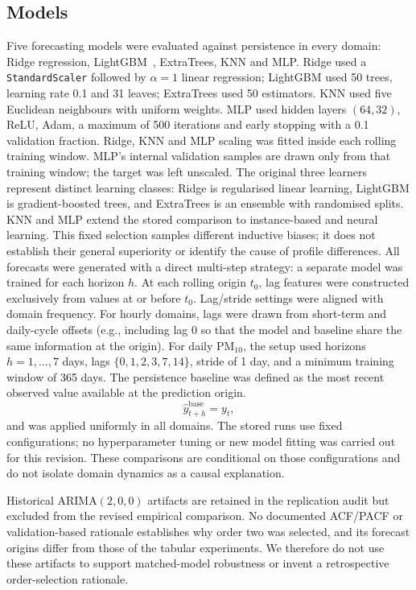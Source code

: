 \documentclass[pdflatex,sn-mathphys]{sn-jnl}
\begin{document}
\subsection{Models}
Five forecasting models were evaluated against persistence in every domain:
Ridge regression, LightGBM~\citep{ke2017lightgbm}, ExtraTrees, KNN and MLP.
Ridge used a \texttt{StandardScaler} followed by $\alpha=1$ linear regression;
LightGBM used 50 trees, learning rate 0.1 and 31 leaves; ExtraTrees used 50
estimators. KNN used five Euclidean neighbours with uniform weights. MLP used
hidden layers $(64,32)$, ReLU, Adam, a maximum of 500 iterations and early
stopping with a 0.1 validation fraction. Ridge, KNN and MLP scaling was fitted
inside each rolling training window. MLP's internal validation samples are
drawn only from that training window; the target was left unscaled.
The original three learners represent distinct learning classes: Ridge is regularised linear learning, LightGBM is gradient-boosted trees, and ExtraTrees is an ensemble with randomised splits. KNN and MLP extend the stored comparison to instance-based and neural learning. This fixed selection samples different inductive biases; it does not establish their general superiority or identify the cause of profile differences.
All forecasts were generated with a direct multi-step strategy: a separate model was trained for each horizon $h$. At each rolling origin $t_0$, lag features were constructed exclusively from values at or before $t_0$.
Lag/stride settings were aligned with domain frequency. For hourly domains, lags were drawn from short-term and daily-cycle offsets (e.g., including lag 0 so that the model and baseline share the same information at the origin). For daily PM$_{10}$, the setup used horizons $h=1,\ldots,7$ days, lags $\{0,1,2,3,7,14\}$, stride of 1 day, and a minimum training window of 365 days.
The persistence baseline was defined as the most recent observed value available at the prediction origin.
\begin{equation}
\hat{y}^{\mathrm{base}}_{t+h} = y_{t},
\end{equation}
and was applied uniformly in all domains.
The stored runs use fixed configurations; no hyperparameter tuning or new model fitting was carried out for this revision. These comparisons are conditional on those configurations and do not isolate domain dynamics as a causal explanation.

Historical ARIMA$(2,0,0)$ artifacts are retained in the replication audit but
excluded from the revised empirical comparison. No documented ACF/PACF or
validation-based rationale establishes why order two was selected, and its
forecast origins differ from those of the tabular experiments. We therefore
do not use these artifacts to support matched-model robustness or invent a
retrospective order-selection rationale.
\end{document}
